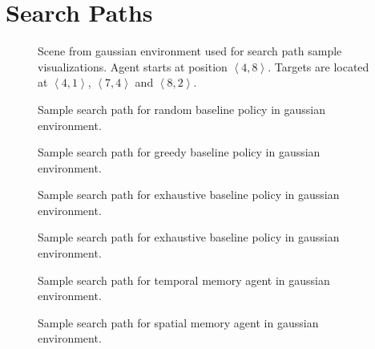 \chapter{Search Paths}
\label{app:paths}

\begin{figure}
    \centering
    
    \caption[Scene for search paths]{Scene from gaussian environment used for search path sample visualizations. Agent starts at position \(\left\langle 4, 8 \right\rangle\). Targets are located at \(\left\langle 4, 1 \right\rangle\), \(\left\langle 7, 4 \right\rangle\) and \(\left\langle 8, 2 \right\rangle\).}
    \label{fig:path-scene}
\end{figure}    

\begin{figure}
    \centering
    
    \caption[Random baseline search path]{Sample search path for random baseline policy in gaussian environment.}
    \label{fig:path-random}
\end{figure}

\begin{figure}
    \centering
    
    \caption[Random baseline search path]{Sample search path for greedy baseline policy in gaussian environment.}
    \label{fig:path-greedy}
\end{figure}

\begin{figure}
    \centering
    
    \caption[Random baseline search path]{Sample search path for exhaustive baseline policy in gaussian environment.}
    \label{fig:path-exhaustive}
\end{figure}

\begin{figure}
    \centering
    
    \caption[Random baseline search path]{Sample search path for exhaustive baseline policy in gaussian environment.}
    \label{fig:path-handcrafted}
\end{figure}

\begin{figure}
    \centering
    
    \caption[Temporal memory agent search path]{Sample search path for temporal memory agent in gaussian environment.}
    \label{fig:path-lstm}
\end{figure}

\begin{figure}
    \centering
    
    \caption[Spatial memory agent search path]{Sample search path for spatial memory agent in gaussian environment.}
    \label{fig:path-map}
\end{figure}